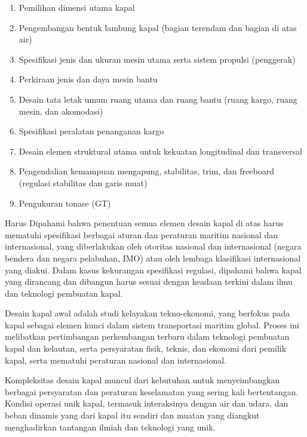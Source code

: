 \begin{enumerate}[label=\textbullet]
    \item Pemilihan dimensi utama kapal
    \item Pengembangan bentuk lambung kapal (bagian terendam dan bagian di atas air)
    \item Spesifikasi jenis dan ukuran mesin utama serta sistem propulsi (penggerak)
    \item Perkiraan jenis dan daya mesin bantu
    \item Desain tata letak umum ruang utama dan ruang bantu (ruang kargo, ruang mesin, dan akomodasi)
    \item Spesifikasi peralatan penanganan kargo
    \item Desain elemen struktural utama untuk kekuatan longitudinal dan transversal
    \item Pengendalian kemampuan mengapung, stabilitas, trim, dan freeboard (regulasi stabilitas dan garis muat)
    \item Pengukuran tonase (GT)
\end{enumerate}

Harus Dipahami bahwa penentuan semua elemen desain kapal di atas harus mematuhi spesifikasi berbagai aturan dan peraturan maritim nasional dan internasional, yang diberlakukan oleh otoritas nasional dan internasional (negara bendera dan negara pelabuhan, IMO) atau oleh lembaga klasifikasi internasional yang diakui. Dalam kasus kekurangan spesifikasi regulasi, dipahami bahwa kapal yang dirancang dan dibangun harus sesuai dengan keadaan terkini dalam ilmu dan teknologi pembuatan kapal.

Desain kapal awal adalah studi kelayakan tekno-ekonomi, yang berfokus pada kapal sebagai elemen kunci dalam sistem transportasi maritim global. Proses ini melibatkan pertimbangan perkembangan terbaru dalam teknologi pembuatan kapal dan kelautan, serta persyaratan fisik, teknis, dan ekonomi dari pemilik kapal, serta mematuhi peraturan nasional dan internasional.

Kompleksitas desain kapal muncul dari kebutuhan untuk menyeimbangkan berbagai persyaratan dan peraturan keselamatan yang sering kali bertentangan. Kondisi operasi unik kapal, termasuk interaksinya dengan air dan udara, dan beban dinamis yang dari kapal itu sendiri dan muatan yang diangkut  menghadirkan tantangan ilmiah dan teknologi yang unik.

